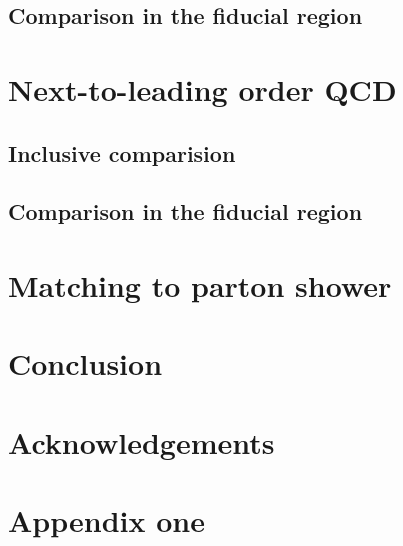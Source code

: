 \documentclass[twocolumn,epjc3]{svjour3} %
\begin{document}


\subsection{Comparison in the fiducial region}
\label{subsec:LOfiducial}





\section{Next-to-leading order QCD}
\label{sec:NLO}

\subsection{Inclusive comparision}
\label{subsec:NLOinclusive}



\subsection{Comparison in the fiducial region}






\section{Matching to parton shower}
\label{sec:matching}



\section{Conclusion}
\label{sec:conclusion}




\section*{Acknowledgements}



\appendix

\section{Appendix one}




\end{document}

